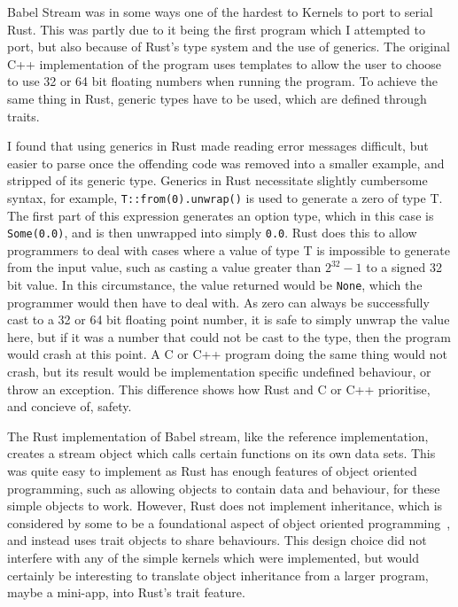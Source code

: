 Babel Stream was in some ways one of the hardest to Kernels to port to serial Rust. This was partly due to it being the first program which I attempted to port, but also because of Rust's type system and the use of generics. The original C++ implementation of the program uses templates to allow the user to choose to use 32 or 64 bit floating numbers when running the program. To achieve the same thing in Rust, generic types have to be used, which are defined through traits.

I found that using generics in Rust made reading error messages difficult, but easier to parse once the offending code was removed into a smaller example, and stripped of its generic type. Generics in Rust necessitate slightly cumbersome syntax, for example, \texttt{T::from(0).unwrap()} is used to generate a zero of type T. The first part of this expression generates an option type, which in this case is \texttt{Some(0.0)}, and is then unwrapped into simply \texttt{0.0}. Rust does this to allow programmers to deal with cases where a value of type T is impossible to generate from the input value, such as casting a value greater than $2^{32} - 1$ to a signed 32 bit value.
In this circumstance, the value returned would be \texttt{None}, which the programmer would then have to deal with. As zero can always be successfully cast to a 32 or 64 bit floating point number, it is safe to simply unwrap the value here, but if it was a number that could not be cast to the type, then the program would crash at this point. A C or C++ program doing the same thing would not crash, but its result would be implementation specific undefined behaviour, or throw an exception. This difference shows how Rust and C or C++ prioritise, and concieve of, safety.

The Rust implementation of Babel stream, like the reference implementation, creates a stream object which calls certain functions on its own data sets. This was quite easy to implement as Rust has enough features of object oriented programming, such as allowing objects to contain data and behaviour, for these simple objects to work. However, Rust does not implement inheritance, which is considered by some to be a foundational aspect of object oriented programming~\cite{Liskov:1987}, and instead uses trait objects to share behaviours. This design choice did not interfere with any of the simple kernels which were implemented, but would certainly be interesting to translate object inheritance from a larger program, maybe a mini-app, into Rust's trait feature.

